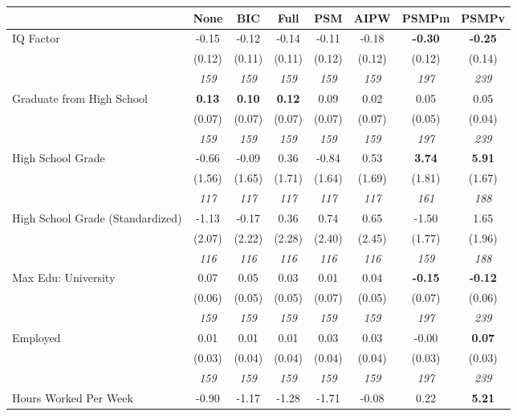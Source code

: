 \begin{tabular}{l c c c c c c c}
\toprule
 & None & BIC & Full & PSM & AIPW & PSMPm & PSMPv \\
\midrule
IQ Factor & -0.15 & -0.12 & -0.14 & -0.11 & -0.18 & \textbf{-0.30} & \textbf{-0.25} \\
& (0.12) & (0.11) & (0.11) & (0.12) & (0.12) & (0.12) & (0.14) \\
& \textit{ 159 } & \textit{ 159 } & \textit{ 159 } & \textit{ 159 } & \textit{ 159 } & \textit{ 197 } & \textit{ 239 } \\
Graduate from High School & \textbf{ 0.13 } & \textbf{ 0.10 } & \textbf{ 0.12 } & 0.09 & 0.02 & 0.05 & 0.05 \\
& (0.07) & (0.07) & (0.07) & (0.07) & (0.07) & (0.05) & (0.04) \\
& \textit{ 159 } & \textit{ 159 } & \textit{ 159 } & \textit{ 159 } & \textit{ 159 } & \textit{ 197 } & \textit{ 239 } \\
High School Grade & -0.66 & -0.09 & 0.36 & -0.84 & 0.53 & \textbf{3.74} & \textbf{5.91} \\
& (1.56) & (1.65) & (1.71) & (1.64) & (1.69) & (1.81) & (1.67) \\
& \textit{ 117 } & \textit{ 117 } & \textit{ 117 } & \textit{ 117 } & \textit{ 117 } & \textit{ 161 } & \textit{ 188 } \\
High School Grade (Standardized) & -1.13 & -0.17 & 0.36 & 0.74 & 0.65 & -1.50 & 1.65 \\
& (2.07) & (2.22) & (2.28) & (2.40) & (2.45) & (1.77) & (1.96) \\
& \textit{ 116 } & \textit{ 116 } & \textit{ 116 } & \textit{ 116 } & \textit{ 116 } & \textit{ 159 } & \textit{ 188 } \\
Max Edu: University & 0.07 & 0.05 & 0.03 & 0.01 & 0.04 & \textbf{-0.15} & \textbf{-0.12} \\
& (0.06) & (0.05) & (0.05) & (0.07) & (0.05) & (0.07) & (0.06) \\
& \textit{ 159 } & \textit{ 159 } & \textit{ 159 } & \textit{ 159 } & \textit{ 159 } & \textit{ 197 } & \textit{ 239 } \\
Employed & 0.01 & 0.01 & 0.01 & 0.03 & 0.03 & -0.00 & \textbf{0.07} \\
& (0.03) & (0.04) & (0.04) & (0.04) & (0.04) & (0.03) & (0.03) \\
& \textit{ 159 } & \textit{ 159 } & \textit{ 159 } & \textit{ 159 } & \textit{ 159 } & \textit{ 197 } & \textit{ 239 } \\
Hours Worked Per Week & -0.90 & -1.17 & -1.28 & -1.71 & -0.08 & 0.22 & \textbf{5.21} \\

\end{tabular}
